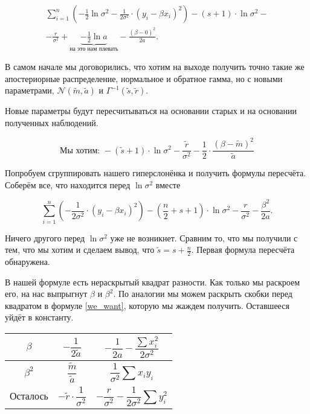\documentclass[12pt, a4paper, oneside]{extreport}
\def \b{\beta}
\def \mN{\mathcal{N}}
\theoremstyle{plain}              %
\theoremstyle{definition}         %
\begin{document}
\begin{multline*}
\sum_{i=1}^n \left( -\frac{1}{2} \ln \sigma^2 - \frac{1}{2\sigma^2} \cdot (y_i - \b x_i)^2 \right) - (s + 1) \cdot \ln \sigma^2 - \\ -  \frac{r}{\sigma^2} +  \underbrace{- \frac{1}{2} \ln a}_{\text{на это нам плевать}} - \frac{(\b - 0)^2}{2 a}.
\end{multline*}

В самом начале мы договорились, что хотим на выходе получить точно такие же апостериорные распределение, нормальное и обратное гамма, но с новыми параметрами, $\mN(\tilde m, \tilde a)$ и $\Gamma^{-1} ( \tilde s, \tilde r)$. 

Новые параметры будут пересчитываться на основании старых и на основании полученных наблюдений.

\begin{equation}\label{we_want}
\text{Мы хотим: } -(\tilde{s} + 1) \cdot \ln \sigma^2 - \frac{\tilde{r}}{\sigma^2} - \frac{1}{2} \cdot \frac{(\b - \tilde m)^2}{\tilde{a}} 
\end{equation}

Попробуем сгруппировать нашего гиперслонёнка и получить  формулы пересчёта. Соберём все, что находится перед $\ln \sigma^2$ вместе 

\[\sum_{i=1}^n \left( - \frac{1}{2\sigma^2} \cdot (y_i - \b x_i)^2 \right) - \left(\frac{n}{2} + s + 1\right) \cdot \ln \sigma^2 - \frac{r}{\sigma^2} - \frac{\b^2}{2 a}.\]

Ничего другого перед $\ln \sigma^2$ уже не возникнет. Сравним то, что мы получили с тем, что мы хотим и сделаем вывод, что $\tilde s = s + \frac{n}{2}$. Первая формула пересчёта обнаружена. 

В нашей формуле есть нераскрытый квадрат разности. Как только мы раскроем его, на нас выпрыгнут $\b$ и $\b^2$. По аналогии мы можем раскрыть скобки перед квадратом в формуле \eqref{we_want}, которую мы жаждем получить. Оставшееся уйдёт в константу.

\begin{tabularx}{\textwidth}{X|X|X}
	\[\b\]& \[ - \frac{1}{2 \tilde a} \] & \[ - \frac{1}{2a} - \frac{\sum x_i^2}{2\sigma^2} \] \\ \hline
	\[\b^2\]& \[ \frac{\tilde m}{\tilde a}\] & \[ \frac{1}{\sigma^2} \sum x_i y_i\] \\ \hline
	\[\text{Осталось}\]&  \[ - \tilde r \cdot \frac{1}{\sigma^2} \] & \[ -\frac{r}{\sigma^2} - \frac{1}{2\sigma^2} \sum y_i^2 \] 
\end{tabularx}
\end{document}
